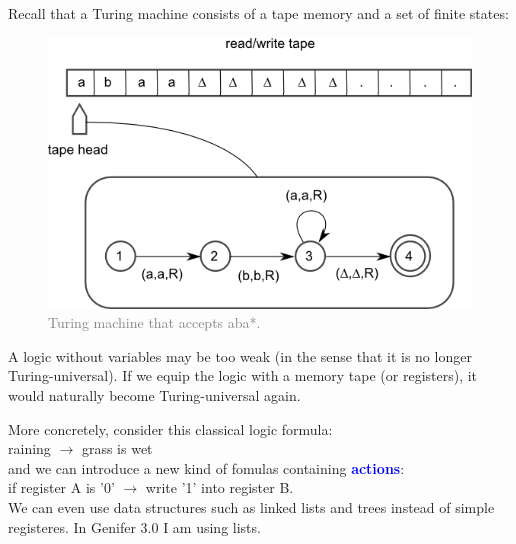 \documentclass[12pt]{article}
\newcommand{\concept}[1]{\textbf{\textcolor{blue}{#1}}}
\newcommand{\formula}[1]{\ttfamily\textcolor{LogicColor}{#1}\rmfamily}
\newcommand{\tab}{\hspace*{1cm}}
\begin{document}
Recall that a Turing machine consists of a tape memory and a set of finite states:
\begin{figure}[H]
\centering
\includegraphics[scale=0.75]{Turing-machine.png}
\caption{\textcolor{grey}{Turing machine that accepts aba*.}}
\label{fig:ontology-relations-relations}
\end{figure}

A logic without variables may be too weak (in the sense that it is no longer Turing-universal).  If we equip the logic with a memory tape (or registers), it would naturally become Turing-universal again.

More concretely, consider this classical logic formula:\\
\tab \formula{raining $\rightarrow$ grass is wet}\\
and we can introduce a new kind of fomulas containing \concept{actions}:\\
\tab \formula{if register A is '0' $\rightarrow$ write '1' into register B}.\\
We can even use data structures such as linked lists and trees instead of simple registeres.  In Genifer 3.0 I am using lists.

\end{document}
